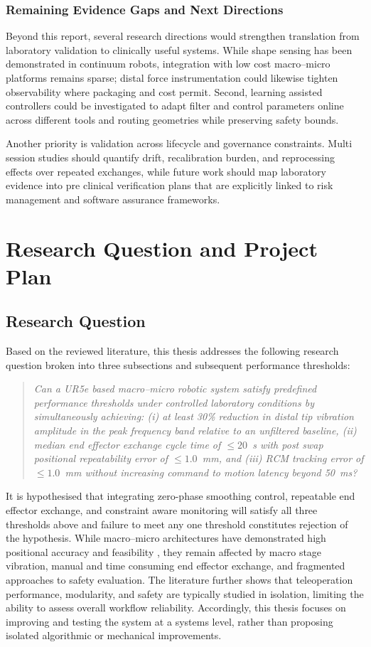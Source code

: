 \documentclass[12pt]{article}
\begin{document}
\subsubsection{Remaining Evidence Gaps and Next Directions}
Beyond this report, several research directions would
strengthen translation from laboratory validation to clinically useful systems.
While shape sensing has been demonstrated in continuum robots, integration with low cost macro--micro platforms remains sparse; distal force instrumentation could likewise tighten observability where packaging and cost permit. Second, learning assisted
controllers could be investigated to adapt filter and control parameters online
across different tools and routing geometries while preserving safety bounds.

Another priority is validation across lifecycle and governance
constraints. Multi session studies should quantify drift, recalibration burden,
and reprocessing effects over repeated exchanges, while future work should
map laboratory evidence into pre clinical verification plans that are explicitly
linked to risk management and software assurance frameworks.

\section{Research Question and Project Plan}

\subsection{Research Question}

Based on the reviewed literature, this thesis
addresses the following research question broken into three subsections and subsequent performance thresholds:
\begin{quote}
\textit{Can a UR5e based macro--micro robotic system satisfy predefined performance thresholds under controlled laboratory 
conditions by simultaneously achieving: (i) at least 30\% reduction in distal tip vibration amplitude in the peak frequency band relative to an unfiltered baseline, (ii) median end effector exchange cycle time of $\leq 20$~s with post swap positional repeatability error of $\leq 1.0$~mm, 
and (iii) RCM tracking error of $\leq 1.0$~mm without increasing command to motion latency beyond 50~ms?}
\end{quote}
\noindent It is hypothesised that integrating zero-phase smoothing control,
repeatable end effector exchange, and constraint aware monitoring will satisfy
all three thresholds above and failure to meet any one threshold constitutes
rejection of the hypothesis.
While macro--micro architectures have demonstrated high positional accuracy and
feasibility \cite{scott2023macro}, they remain affected by macro stage vibration,
manual and time consuming end effector exchange, and fragmented approaches to
safety evaluation. The literature further shows that teleoperation performance,
modularity, and safety are typically studied in isolation, limiting the ability
to assess overall workflow reliability. Accordingly, this thesis focuses on improving and testing the system at a
systems level, rather than proposing isolated algorithmic or mechanical
improvements.
\end{document}
